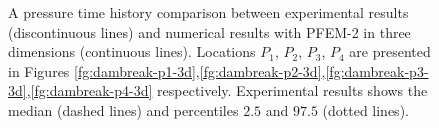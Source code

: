 \begin{figure}[h]
{    }
   \caption{A pressure time history comparison between experimental results\cite{Lobovsky13} (discontinuous lines) and numerical results with PFEM-2 in three dimensions (continuous lines). Locations $P_1$, $P_2$, $P_3$, $P_4$ are presented in Figures \ref{fg:dambreak-p1-3d},\ref{fg:dambreak-p2-3d},\ref{fg:dambreak-p3-3d},\ref{fg:dambreak-p4-3d} respectively. Experimental results shows the median (dashed lines) and percentiles $2.5$ and $97.5$ (dotted lines).}
   \label{fg:dambreak-p-3d}                %
\end{figure}
\clearpage

